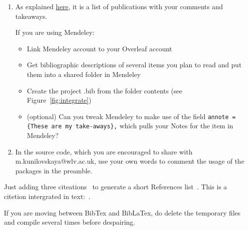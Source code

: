 \documentclass[a4paper,11pt]{article}
\begin{document}
\begin{tcolorbox}[width=\textwidth, colback={yellow!40!white}, title={Create an annotated bibliography and revise imported packages}, colbacktitle=yellow!60!white, coltitle=black]
	\begin{enumerate}
		\item As explained \href{https://www.wlv.ac.uk/lib/media/departments/lis/skills/study-guides/LS136-Guide-to-Writing-an-Annotated-Bibliography.pdf}{here}, it is a list of publications with your comments and takeaways.
		
			If you are using Mendeley:
			\begin{itemize}
				\item Link Mendeley account to your Overleaf account
				\item Get bibliographic descriptions of several items you plan to read and put them into a shared folder in Mendeley
				\item Create the project .bib from the folder contents (see Figure~\ref{fig:integrate})
				\item (optional) Can you tweak Mendeley to make use of the field \verb|annote = {These are my take-aways},| which pulls your Notes for the item in Mendeley?
			\end{itemize}
		\item In the source code, which you are encouraged to share with m.kunilovskaya@wlv.ac.uk, use your own words to comment the usage of the packages in the preamble.
	\end{enumerate}
	
\end{tcolorbox}%

Just adding three citeations~\autocite{Scarton2018} to generate a short References list~\textcite[p.~215]{Tani2022}. This is a citetion intergrated in text:~\textcite{Alva-Manchego2021}. 

\bigskip

If you are moving between BibTex and BibLaTex, do delete the temporary files and compile several times before despairing. 



%
%


\printbibliography[title=Cited Works]
\end{document}
